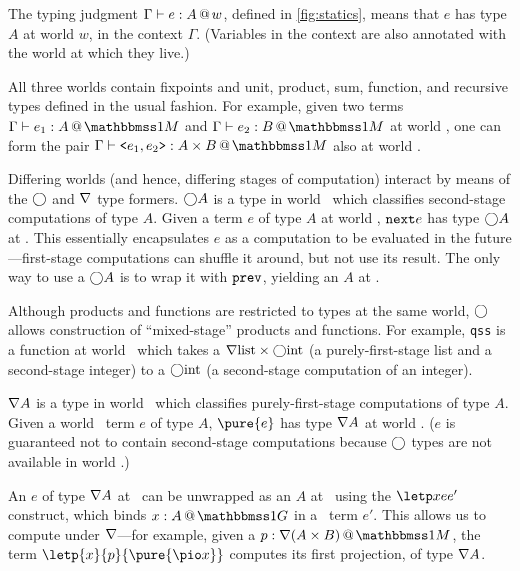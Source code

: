 \begin{abstrsyn}

The typing judgment $\Gamma{} \vdash {e}:{A}~\hspace{-0.15em}\text{@}\hspace{-0.2em}~w$, defined in \ref{fig:statics}, means that
$e$ has type $A$ at world $w$, in the context $\Gamma$. (Variables in the
context are also annotated with the world at which they live.)

All three worlds contain fixpoints and unit, product, sum, function, and
recursive types defined in the usual fashion. For example, given two terms
$\typesone{e_1}A$ and $\typesone{e_2}B$ at world \bbonem, one can form the pair
$\typesone{\texttt{<}e_1,e_2\texttt{>}}{A\times B}$ also at world \bbonem. 

Differing worlds (and hence, differing stages of computation) interact by means
of the $\bigcirc$ and $\nabla$ type formers. $\bigcirc A$ is a type in world \bbonem\
which classifies second-stage computations of type $A$. Given a term $e$ of type
$A$ at world \bbtwo, ${\tt next}{e}$ has type $\bigcirc A$ at \bbonem. This essentially
encapsulates $e$ as a computation to be evaluated in the future---first-stage
computations can shuffle it around, but not use its result.  The only way to use
a $\bigcirc A$ is to wrap it with ${\tt prev}$, yielding an $A$ at \bbtwo.


Although products and functions are restricted to types at the same world,
$\bigcirc$ allows construction of ``mixed-stage'' products and functions.
For example, \texttt{qss} is a function at world \bbonem\ which takes a
$\nabla{\rm list} \times \bigcirc{\rm int}$ (a purely-first-stage list and a
second-stage integer) to a $\bigcirc{\rm int}$ (a second-stage
computation of an integer).

$\nabla A$ is a type in world \bbonem\ which classifies purely-first-stage
computations of type $A$. Given a world \bbonep\ term $e$ of type $A$,
$\pure{e}$ has type $\nabla A$ at world \bbonem. ($e$ is guaranteed not to contain
second-stage computations because $\bigcirc$ types are not available in world
\bbonep.)

An $e$ of type $\nabla A$ at \bbonem\ can be unwrapped as an $A$ at \bbonep\
using the $\letp xe{e'}$ construct, which binds $\colpure xA$ in a \bbonem\ term
$e'$. This allows us to compute under $\nabla$---for example, given a $\colmix
p{\curr(A\times B)}$, the term $\letp{x}{p}{\pure{\pio x}}$ computes its first
projection, of type $\nabla A$.


\end{abstrsyn}
